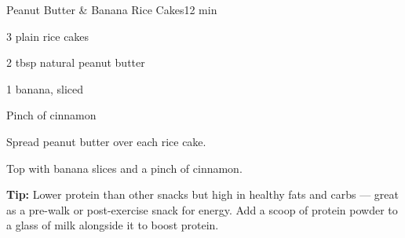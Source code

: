 \begin{recipebox}{Peanut Butter \& Banana Rice Cakes}{1}{2 min}
\begin{ingredients}
  \item 3 plain rice cakes
  \item 2 tbsp natural peanut butter
  \item 1 banana, sliced
  \item Pinch of cinnamon
\end{ingredients}

\begin{method}
  \item Spread peanut butter over each rice cake.
  \item Top with banana slices and a pinch of cinnamon.
\end{method}

\begin{notelist}
  \item \textbf{Tip:} Lower protein than other snacks but high in healthy fats and carbs --- great as a pre-walk or post-exercise snack for energy. Add a scoop of protein powder to a glass of milk alongside it to boost protein.
\end{notelist}
\end{recipebox}
